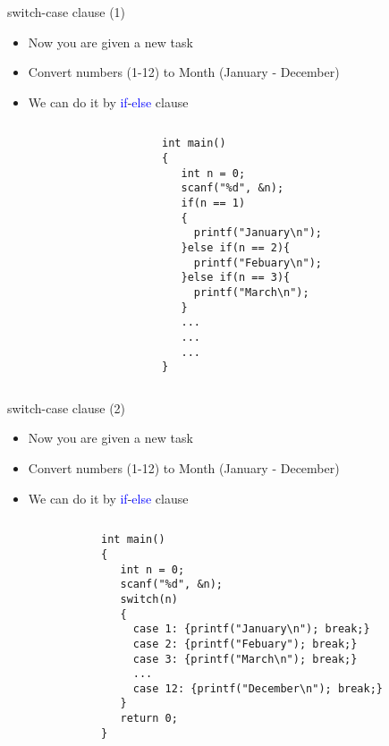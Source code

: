 \begin{frame}[fragile]{switch-case clause (1)}
\begin{itemize}
	\item {Now you are given a new task}
	\item {Convert numbers (1-12) to Month (January - December)}
	\item {We can do it by \textcolor{blue}{if}-\textcolor{blue}{else} clause}
\end{itemize}
\vspace{-0.2in}
\begin{columns}
\begin{column}{0.05\linewidth}
\end{column}
\begin{column}{0.6\linewidth}
\begin{lstlisting}[numbers=none, basicstyle=\footnotesize]
int main()
{
   int n = 0;
   scanf("%d", &n);
   if(n == 1)
   {
     printf("January\n");
   }else if(n == 2){
     printf("Febuary\n");
   }else if(n == 3){
     printf("March\n");
   }
   ...
   ...
   ...
}
\end{lstlisting}
\end{column}
\end{columns}
\end{frame}

\begin{frame}[fragile]{switch-case clause (2)}
\begin{itemize}
	\item {Now you are given a new task}
	\item {Convert numbers (1-12) to Month (January - December)}
	\item {We can do it by \textcolor{blue}{if}-\textcolor{blue}{else} clause}
\end{itemize}
\vspace{-0.2in}
\begin{columns}
\begin{column}{0.1\linewidth}
\end{column}
\begin{column}{0.8\linewidth}
\begin{lstlisting}[numbers=none, basicstyle=\footnotesize]
int main()
{
   int n = 0;
   scanf("%d", &n);
   switch(n)
   {
     case 1: {printf("January\n"); break;}
     case 2: {printf("Febuary"); break;}
     case 3: {printf("March\n"); break;}
     ...
     case 12: {printf("December\n"); break;}
   }
   return 0;
}
\end{lstlisting}
\end{column}
\end{columns}
\end{frame}

